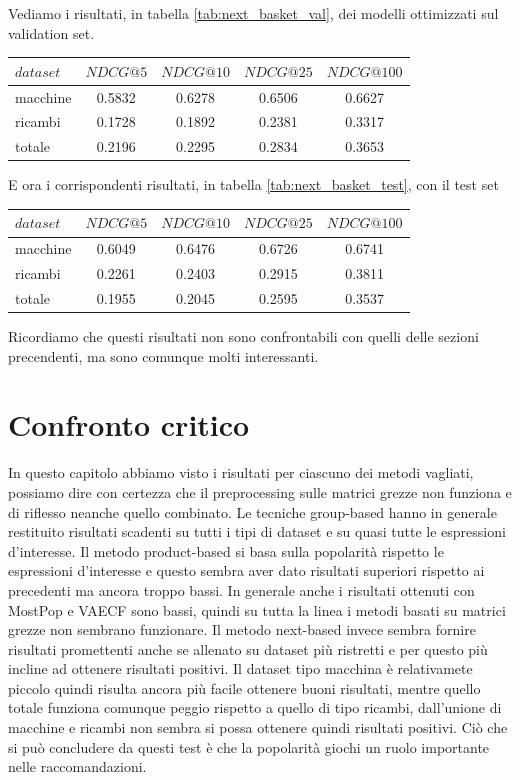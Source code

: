 Vediamo i risultati, in tabella \ref{tab:next_basket_val}, dei modelli ottimizzati sul validation set.
\begin{center}
    \begin{tabular}{|l|cccc|}
        \toprule
        $dataset$  &  $NDCG@5$ & $NDCG@10$  & $NDCG@25$ & $NDCG@100$  \\
        \midrule
        macchine & 0.5832 & 0.6278 & 0.6506 & 0.6627 \\
        ricambi & 0.1728 & 0.1892 & 0.2381 & 0.3317 \\
        totale  & 0.2196 & 0.2295 & 0.2834 & 0.3653 \\
    \bottomrule
    \end{tabular}
    \label{tab:next_basket_val}
\end{center}
E ora i corrispondenti risultati, in tabella \ref{tab:next_basket_test}, con il test set
\begin{center}
\begin{tabular}{|l|cccc|}
    \toprule
    $dataset$  &  $NDCG@5$ & $NDCG@10$  & $NDCG@25$ & $NDCG@100$  \\
    \midrule
    macchine & 0.6049 & 0.6476 & 0.6726 & 0.6741 \\
    ricambi & 0.2261 & 0.2403 & 0.2915 & 0.3811 \\
    totale  & 0.1955 & 0.2045 & 0.2595 & 0.3537 \\
\bottomrule
\end{tabular}
\label{tab:next_basket_test}
\end{center}
Ricordiamo che questi risultati non sono confrontabili con quelli delle sezioni precendenti, ma sono comunque molti interessanti.

\section{Confronto critico}
In questo capitolo abbiamo visto i risultati per ciascuno dei metodi vagliati, possiamo dire con certezza che il preprocessing sulle matrici grezze non funziona e di riflesso neanche quello combinato. Le tecniche group-based hanno in generale restituito risultati scadenti su tutti i tipi di dataset e su quasi tutte le espressioni d'interesse. Il metodo product-based si basa sulla popolarità rispetto le espressioni d'interesse e questo sembra aver dato risultati superiori rispetto ai precedenti ma ancora troppo bassi. In generale anche i risultati ottenuti con MostPop e VAECF sono bassi, quindi su tutta la linea i metodi basati su matrici grezze non sembrano funzionare.
Il metodo next-based invece sembra fornire risultati promettenti anche se allenato su dataset più ristretti e per questo più incline ad ottenere risultati positivi. Il dataset tipo macchina è relativamete piccolo quindi risulta ancora più facile ottenere buoni risultati, mentre quello totale funziona comunque peggio rispetto a quello di tipo ricambi, dall'unione di macchine e ricambi non sembra si possa ottenere quindi risultati positivi.
Ciò che si può concludere da questi test è che la popolarità giochi un ruolo importante nelle raccomandazioni.